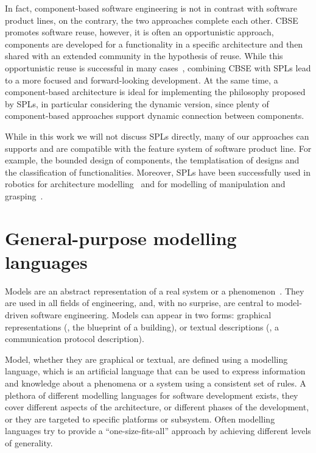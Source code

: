 In fact, component-based software engineering is not in contrast with software product lines, on the contrary, the two approaches complete each other. CBSE promotes software reuse, however, it is often an opportunistic approach, components are developed for a functionality in a specific architecture and then shared with an extended community in the hypothesis of reuse. While this opportunistic reuse is successful in many cases~\cite{jansen2008pragmatic}, combining CBSE with SPLs lead to a more focused and forward-looking development. At the same time, a component-based architecture is ideal for implementing the philosophy proposed by SPLs, in particular considering the dynamic version, since plenty of component-based approaches support dynamic connection between components.

While in this work we will not discuss SPLs directly, many of our approaches can supports and are compatible with the feature system of software product line. For example, the bounded design of components, the templatisation of designs and the classification of functionalities. Moreover, SPLs have been successfully used in robotics for architecture modelling~\cite{gherardi2014modeling, brugali2016hyperflex} and for modelling of manipulation and grasping~\cite{baumgartl2013towards}.
 
\section[General-purpose modelling languages]{General-purpose modelling\\languages}
Models are an abstract representation of a real system or a phenomenon~\cite{schichl2004models}. They are used in all fields of engineering, and, with no surprise, are central to model-driven software engineering. Models can appear in two forms: graphical representations (\eg, the blueprint of a building), or textual descriptions (\eg, a communication protocol description). 

Model, whether they are graphical or textual, are defined using a modelling language, which is an artificial language that can be used to express information and knowledge about a phenomena or a system using a consistent set of rules. A plethora of different modelling languages for software development exists, they cover different aspects of the architecture, or different phases of the development, or they are targeted to specific platforms or subsystem. Often modelling languages try to provide a ``one-size-fits-all'' approach by achieving different levels of generality.

